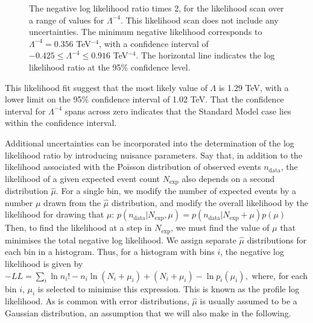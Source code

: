 \begin{figure}[htp]
\begin{minipage}[b]{.69\textwidth}
\begin{infilsf} \tiny

\end{infilsf}
\end{minipage}
\begin{minipage}[b]{.3\textwidth}
\caption{The negative log likelihood ratio times 2, for the likelihood scan over a range of values for $\Lambda^{-4}$. This likelihood scan does not include any uncertainties. The minimum negative likelihood corresponds to $\Lambda^{-4}=0.356$ TeV$^{-4}$, with a confidence interval of $-0.425 \le \Lambda^{-4} \le 0.916$ TeV$^{-4}$. The horizontal line indicates the log likelihood ratio at the 95\% confidence level.}\label{exllr}
\end{minipage}
\end{figure}

This likelihood fit suggest that the most likely value of $\Lambda$ is 1.29 TeV, with a lower limit on the 95\% confidence interval of 1.02 TeV. That the confidence interval for $\Lambda^{-4}$ spans across zero indicates that the Standard Model case lies within the confidence interval.

\begin{edits}
Additional uncertainties can be incorporated into the determination of the log likelihood ratio by introducing nuisance parameters. Say that, in addition to the likelihood associated with the Poisson distribution of observed events $n_\text{data}$, the likelihood of a given expected event count $N_\text{exp}$ also depends on a second distribution $\hat\mu$. For a single bin, we modify the number of expected events by a number $\mu$ drawn from the $\hat\mu$ distribution, and modify the overall likelihood by the likelihood for drawing that $\mu$:
\(p(n_\text{data}|N_\text{exp},\mu)=p(n_\text{data}|N_\text{exp}+\mu)p(\mu)\)
Then, to find the likelihood at a step in $N_\text{exp}$, we must find the value of $\mu$ that minimises the total negative log likelihood. We assign separate $\hat\mu$ distributions for each bin in a histogram. Thus, for a histogram with bins $i$, the negative log likelihood is given by
\(-LL=\sum_i\ln n_i!-n_i\ln(N_i+\mu_i)+(N_i+\mu_i)-\ln p_i(\mu_i),\)
where, for each bin $i$, $\mu_i$ is selected to minimise this expression. This is known as the profile log likelihood. As is common with error distributions, $\hat\mu$ is usually assumed to be a Gaussian distribution, an assumption that we will also make in the following.
\end{edits}

